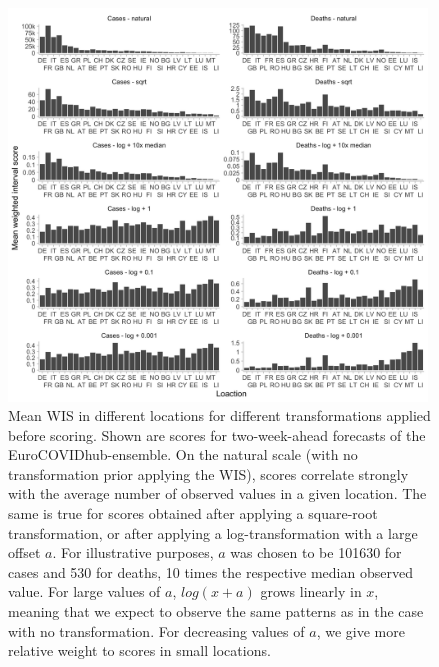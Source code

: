 \documentclass{article}
\begin{document}
\begin{figure}[h!]
    \centering
    \includegraphics[width=0.99\textwidth]{output/figures/HUB-scores-locations-log-variants.png}
    \caption{Mean WIS in different locations for different transformations applied before scoring. Shown are scores for two-week-ahead forecasts of the EuroCOVIDhub-ensemble. On the natural scale (with no transformation prior applying the WIS), scores correlate strongly with the average number of observed values in a given location. The same is true for scores obtained after applying a square-root transformation, or after applying a log-transformation with a large offset $a$. For illustrative purposes, $a$ was chosen to be 101630 for cases and 530 for deaths, 10 times the respective median observed value. For large values of $a$, $log(x + a)$ grows linearly in $x$, meaning that we expect to observe the same patterns as in the case with no transformation. For decreasing values of $a$, we give more relative weight to scores in small locations.}
    \label{fig:HUB-log-different-offsets}
\end{figure}




\clearpage

\end{document}

